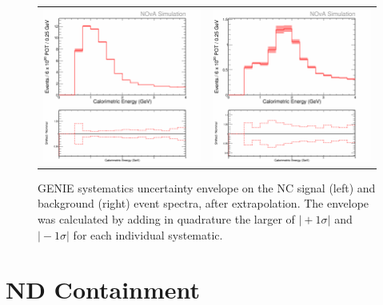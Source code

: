 \begin{figure}[htb]
  \centering
  \begin{tabular}{c c}
    \includegraphics[width=.47\textwidth]{figures/Systs/cNCEXGENIESysts.png} &
    \includegraphics[width=.47\linewidth]{figures/Systs/cBGEXGENIESysts.png} \\
  \end{tabular}
  \caption[GENIE Systematic Uncertainty Envelopes]{GENIE systematics uncertainty envelope on the NC signal (left) and background (right) event spectra, after extrapolation. The envelope was calculated by adding in quadrature the larger of $\vert +1\sigma \vert$ and $\vert -1\sigma \vert$ for each individual systematic.}
  \label{fig:SystGENIE}
\end{figure}

\section{ND Containment}
\label{sec:SystNDCont}

